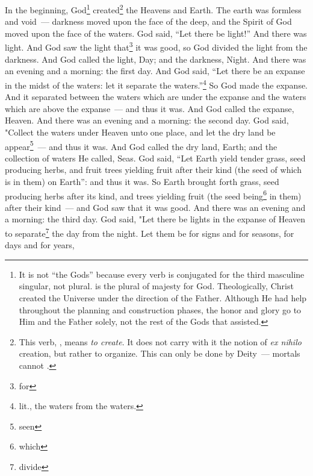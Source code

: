 \begin{enumerate}[align=center]
     In the beginning, God\footnote{It is not ``the Gods'' because every verb is conjugated for the third masculine singular, not plural.  is the plural of majesty for God. Theologically, Christ created the Universe under the direction of the Father. Although He had help throughout the planning and construction phases, the honor and glory go to Him and the Father solely, not the rest of the Gods that assisted.} created\footnote{This verb, , means \textit{to create}. It does not carry with it the notion of \textit{ex nihilo} creation, but rather to organize. This can only be done by Deity~--- mortals cannot .} the Heavens and Earth.%
     The earth was formless and void~--- darkness moved upon the face of the deep, and the Spirit of God moved upon the face of the waters.%
     God said, ``Let there be light!'' And there was light.%
     And God saw the light that\footnote{for} it was good, so God divided the light from the darkness.%
     And God called the light, Day; and the darkness, Night. And there was an evening and a morning: the first day.%
     And God said, ``Let there be an expanse in the midst of the waters: let it separate the waters.''\footnote{lit., the waters from the waters.}%
     So God made the expanse. And it separated between the waters which are under the expanse and the waters which are above the expanse~--- and thus it was.%
     And God called the expanse, Heaven. And there was an evening and a morning: the second day.%
     God said, "Collect the waters under Heaven unto one place, and let the dry land be appear\footnote{seen}~--- and thus it was.%
     And God called the dry land, Earth; and the collection of waters He called, Seas.%
     God said, ``Let Earth yield tender grass, seed producing herbs, and fruit trees yielding fruit after their kind (the seed of which is in them) on Earth'': and thus it was.%
     So Earth brought forth grass, seed producing herbs after its kind, and trees yielding fruit (the seed being\footnote{which} in them) after their kind~--- and God saw that it was good.%
     And there was an evening and a morning: the third day.%
     God said, "Let there be lights in the expanse of Heaven to separate\footnote{divide} the day from the night. Let them be for signs and for seasons, for days and for years,%

\end{enumerate}
